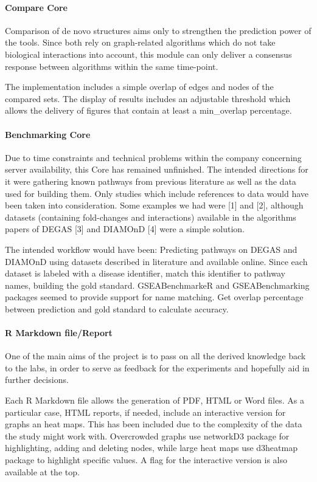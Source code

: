 \paragraph{Compare Core}
Comparison of de novo structures aims only to strengthen the prediction power of the tools. Since both rely on graph-related algorithms which do not take biological interactions into account, this module can only deliver a consensus response between algorithms within the same time-point.


The implementation includes a simple overlap of edges and nodes of the compared sets. The display of results includes an adjustable threshold which allows the delivery of figures that contain at least a min\_overlap percentage.


\paragraph{Benchmarking Core}
Due to time constraints and technical problems within the company concerning server availability, this Core has remained unfinished.
The intended directions for it were gathering known pathways from previous literature as well as the data used for building them. Only studies which include references to data would have been taken into consideration. Some examples we had were [1] and [2], although datasets (containing fold-changes and interactions) available in the algorithms papers of DEGAS [3] and DIAMOnD [4] were a simple solution. 

The intended workflow would have been:
Predicting pathways on DEGAS and DIAMOnD using datasets described in literature and available online.
Since each dataset is labeled with a disease identifier, match this identifier to pathway names, building the gold standard. GSEABenchmarkeR and GSEABenchmarking packages seemed to provide support for name matching.
Get overlap percentage between prediction and gold standard to calculate accuracy.

\paragraph{R Markdown file/Report}
One of the main aims of the project is to pass on all the derived knowledge back to the labs, in order to serve as feedback for the experiments and hopefully aid in further decisions.

Each R Markdown file allows the generation of PDF, HTML or Word files. As a particular case, HTML reports, if needed, include an interactive version for graphs an heat maps. This has been included due to the complexity of the data the study might work with. Overcrowded graphs use networkD3 package for highlighting, adding and deleting nodes, while large heat maps use d3heatmap package to highlight specific values. A flag for the interactive version is also available at the top.